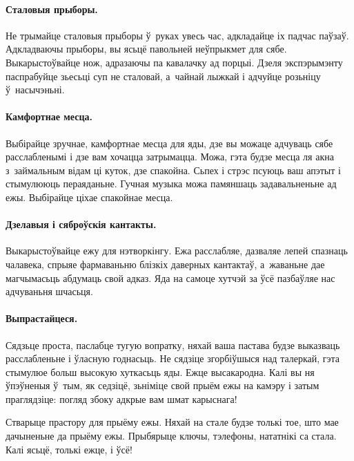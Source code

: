 \paragraph{Сталовыя прыборы.}
Не трымайце сталовыя прыборы ў~руках увесь час, адкладайце іх падчас паўзаў. Адкладваючы прыборы, вы ясьцё павольней неўпрыкмет для сябе. Выкарыстоўвайце нож, адразаючы па кавалачку ад порцыі. Дзеля экспэрымэнту паспрабуйце зьесьці суп не сталовай, а~чайнай лыжкай і адчуйце розьніцу ў~насычэньні.

\paragraph{Камфортнае месца.}
Выбірайце зручнае, камфортнае месца для яды, дзе вы можаце адчуваць сябе расслабленымі і дзе вам хочацца затрымацца. Можа, гэта будзе месца ля акна з~займальным відам ці куток, дзе спакойна. Сьпех і стрэс псуюць ваш апэтыт і стымулююць пераяданьне. Гучная музыка можа памяншаць задавальненьне ад ежы. Выбірайце ціхае спакойнае месца.

\paragraph{Дзелавыя і сяброўскія кантакты.}
Выкарыстоўвайце ежу для нэтворкінгу. Ежа расслабляе, дазваляе лепей спазнаць чалавека, спрыяе фармаваньню блізкіх даверных кантактаў, а~жаваньне дае магчымасьць абдумаць свой адказ. Яда на самоце хутчэй за ўсё пазбаўляе нас адчуваньня шчасьця.

\paragraph{Выпрастайцеся.}
Сядзьце проста, паслабце тугую вопратку, няхай ваша пастава будзе выказваць расслабленьне і ўласную годнасьць. Не сядзіце згорбіўшыся над талеркай, гэта стымулюе больш высокую хуткасьць яды. Ежце высакародна. Калі вы ня ўпэўненыя ў~тым, як седзіцё, зьніміце свой прыём ежы на камэру і затым праглядзіце: погляд збоку адкрые вам шмат карыснага!

Стварыце прастору для прыёму ежы. Няхай на стале будзе толькі тое, што мае дачыненьне да прыёму ежы. Прыбярыце ключы, тэлефоны, нататнікі са стала. Калі ясьцё, толькі ежце, і ўсё!


